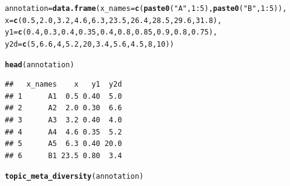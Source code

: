 \documentclass[12pt]{article}\usepackage[]{graphicx}\usepackage[usenames,dvipsnames]{color}
\makeatletter
\newcommand{\hlnum}[1]{\textcolor[rgb]{0.686,0.059,0.569}{#1}}%
\newcommand{\hlstr}[1]{\textcolor[rgb]{0.192,0.494,0.8}{#1}}%
\newcommand{\hlopt}[1]{\textcolor[rgb]{0,0,0}{#1}}%
\newcommand{\hlstd}[1]{\textcolor[rgb]{0.345,0.345,0.345}{#1}}%
\newcommand{\hlkwb}[1]{\textcolor[rgb]{0.69,0.353,0.396}{#1}}%
\newcommand{\hlkwc}[1]{\textcolor[rgb]{0.333,0.667,0.333}{#1}}%
\newcommand{\hlkwd}[1]{\textcolor[rgb]{0.737,0.353,0.396}{\textbf{#1}}}%
\newenvironment{kframe}{%
 \def\at@end@of@kframe{}%
 \ifinner\ifhmode%
  \def\at@end@of@kframe{\end{minipage}}%
  \begin{minipage}{\columnwidth}%
 \fi\fi%
 \def\FrameCommand##1{\hskip\@totalleftmargin \hskip-\fboxsep
 \colorbox{shadecolor}{##1}\hskip-\fboxsep
     \hskip-\linewidth \hskip-\@totalleftmargin \hskip\columnwidth}%
 \MakeFramed {\advance\hsize-\width
   \@totalleftmargin\z@ \linewidth\hsize
   \@setminipage}}%
 {\par\unskip\endMakeFramed%
 \at@end@of@kframe}
\newenvironment{knitrout}{}{} %
\makeatother
\begin{document}
\begin{knitrout}
\color{fgcolor}\begin{kframe}
\begin{alltt}
\hlstd{annotation} \hlkwb{=} \hlkwd{data.frame}\hlstd{(}\hlkwc{x_names} \hlstd{=} \hlkwd{c}\hlstd{(}\hlkwd{paste0}\hlstd{(}\hlstr{"A"}\hlstd{,}\hlnum{1}\hlopt{:}\hlnum{5}\hlstd{),} \hlkwd{paste0}\hlstd{(}\hlstr{"B"}\hlstd{,}\hlnum{1}\hlopt{:}\hlnum{5}\hlstd{)),}
    \hlkwc{x} \hlstd{=} \hlkwd{c}\hlstd{(}\hlnum{0.5}\hlstd{,}\hlnum{2.0}\hlstd{,} \hlnum{3.2}\hlstd{,} \hlnum{4.6}\hlstd{,} \hlnum{6.3}\hlstd{,}  \hlnum{23.5}\hlstd{,} \hlnum{26.4}\hlstd{,} \hlnum{28.5}\hlstd{,} \hlnum{29.6}\hlstd{,} \hlnum{31.8}\hlstd{),}
    \hlkwc{y1} \hlstd{=} \hlkwd{c}\hlstd{(}\hlnum{0.4}\hlstd{,} \hlnum{0.3}\hlstd{,} \hlnum{0.4}\hlstd{,} \hlnum{0.35}\hlstd{,} \hlnum{0.4}\hlstd{,} \hlnum{0.8}\hlstd{,} \hlnum{0.85}\hlstd{,} \hlnum{0.9}\hlstd{,} \hlnum{0.8}\hlstd{,} \hlnum{0.75}\hlstd{),}
    \hlkwc{y2d} \hlstd{=}\hlkwd{c}\hlstd{(}\hlnum{5}\hlstd{,} \hlnum{6.6}\hlstd{,} \hlnum{4}\hlstd{,} \hlnum{5.2}\hlstd{,} \hlnum{20}\hlstd{,} \hlnum{3.4}\hlstd{,} \hlnum{5.6}\hlstd{,} \hlnum{4.5}\hlstd{,} \hlnum{8}\hlstd{,} \hlnum{10}\hlstd{))}

\hlkwd{head}\hlstd{(annotation)}
\end{alltt}
\begin{verbatim}
##   x_names    x   y1  y2d
## 1      A1  0.5 0.40  5.0
## 2      A2  2.0 0.30  6.6
## 3      A3  3.2 0.40  4.0
## 4      A4  4.6 0.35  5.2
## 5      A5  6.3 0.40 20.0
## 6      B1 23.5 0.80  3.4
\end{verbatim}
\begin{alltt}
\hlkwd{topic_meta_diversity}\hlstd{(annotation)}
\end{alltt}
\end{kframe}
\end{knitrout}
\end{document}
